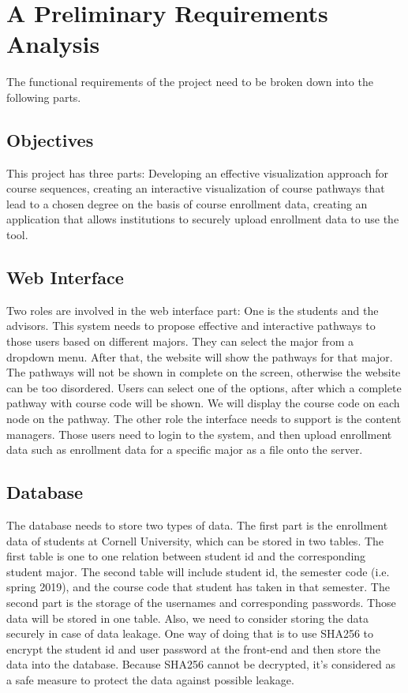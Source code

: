 \documentclass{article}
\begin{document}
\section{A Preliminary Requirements Analysis}
The functional requirements of the project need to be broken down into the following parts.
\subsection{Objectives}
This project has three parts: Developing an effective visualization approach for course sequences, creating an interactive visualization of course pathways that lead to a chosen degree on the basis of course enrollment data, creating an application that allows institutions to securely upload enrollment data to use the tool.

\subsection{Web Interface}
Two roles are involved in the web interface part:  One is the students and the advisors. This system needs to propose effective and interactive pathways to those users based on different majors. They can select the major from a dropdown menu. After that, the website will show the pathways for that major. The pathways will not be shown in complete on the screen, otherwise the website can be too disordered. Users can select one of the options, after which a complete pathway with course code will be shown. We will display the course code on each node on the pathway. The other role the interface needs to support is the content managers. Those users need to login to the system, and then upload enrollment data such as enrollment data for a specific major as a file onto the server.

\subsection{Database}
The database needs to store two types of data. The first part is the enrollment data of students at Cornell University, which can be stored in two tables. The first table is one to one relation between student id and the corresponding student major. The second table will include student id, the semester code (i.e. spring 2019), and the course code that student has taken in that semester. The second part is the storage of the usernames and corresponding passwords. Those data will be stored in one table. Also, we need to consider storing the data securely in case of data leakage. One way of doing that is to use SHA256 to encrypt the student id and user password at the front-end and then store the data into the database. Because SHA256 cannot be decrypted, it’s considered as a safe measure to protect the data against possible leakage.
\end{document}
